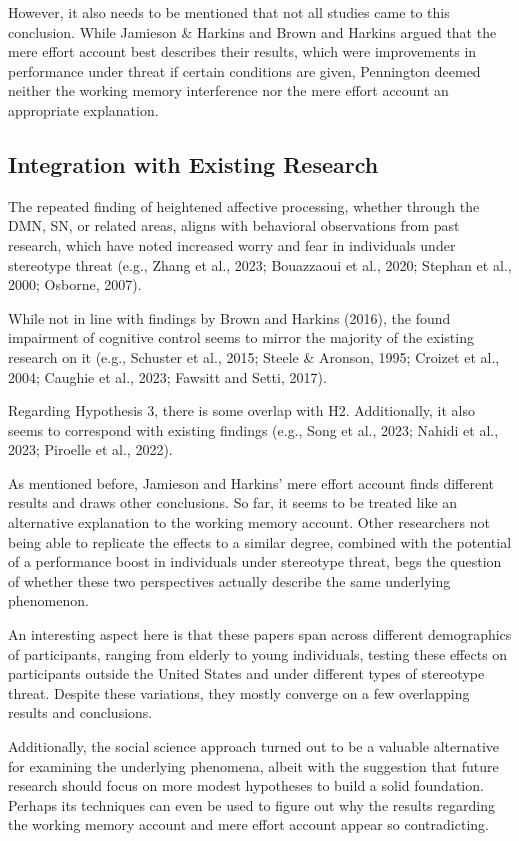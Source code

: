 \documentclass[
  stu, a4paper,floatsintext]{apa7}
\begin{document}
However, it also needs to be mentioned that not all studies came to this conclusion. While Jamieson \& Harkins and Brown and Harkins argued that the mere effort account best describes their results, which were improvements in performance under threat if certain conditions are given, Pennington deemed neither the working memory interference nor the mere effort account an appropriate explanation.

\subsection{Integration with Existing Research}\label{integration-with-existing-research}

The repeated finding of heightened affective processing, whether through the DMN, SN, or related areas, aligns with behavioral observations from past research, which have noted increased worry and fear in individuals under stereotype threat (e.g., Zhang et al., 2023; Bouazzaoui et al., 2020; Stephan et al., 2000; Osborne, 2007).

While not in line with findings by Brown and Harkins (2016), the found impairment of cognitive control seems to mirror the majority of the existing research on it (e.g., Schuster et al., 2015; Steele \& Aronson, 1995; Croizet et al., 2004; Caughie et al., 2023; Fawsitt and Setti, 2017).

Regarding Hypothesis 3, there is some overlap with H2. Additionally, it also seems to correspond with existing findings (e.g., Song et al., 2023; Nahidi et al., 2023; Piroelle et al., 2022).

As mentioned before, Jamieson and Harkins' mere effort account finds different results and draws other conclusions. So far, it seems to be treated like an alternative explanation to the working memory account. Other researchers not being able to replicate the effects to a similar degree, combined with the potential of a performance boost in individuals under stereotype threat, begs the question of whether these two perspectives actually describe the same underlying phenomenon.

An interesting aspect here is that these papers span across different demographics of participants, ranging from elderly to young individuals, testing these effects on participants outside the United States and under different types of stereotype threat. Despite these variations, they mostly converge on a few overlapping results and conclusions.

Additionally, the social science approach turned out to be a valuable alternative for examining the underlying phenomena, albeit with the suggestion that future research should focus on more modest hypotheses to build a solid foundation. Perhaps its techniques can even be used to figure out why the results regarding the working memory account and mere effort account appear so contradicting.
\end{document}
